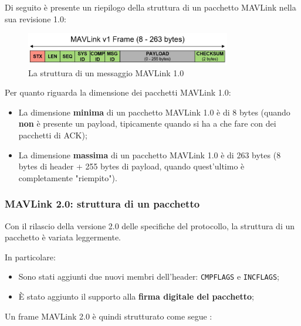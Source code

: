 \documentclass[a4paper, 12pt, oneside]{article}
\begin{document}
Di seguito è presente un riepilogo della struttura di un pacchetto MAVLink nella sua revisione 1.0:

\begin{figure}[H]
    \centering
    \includegraphics[width=0.8\textwidth]{images/packet_mavlink_v1.jpg}
    \caption{La struttura di un messaggio MAVLink 1.0}
\end{figure}

Per quanto riguarda la dimensione dei pacchetti MAVLink 1.0:

\begin{itemize}
    \item La dimensione \textbf{minima} di un pacchetto MAVLink 1.0 è di 8 bytes (quando \textbf{non} è presente un payload, tipicamente quando si ha a che fare con dei pacchetti di ACK);
    \item La dimensione \textbf{massima} di un pacchetto MAVLink 1.0 è di 263 bytes (8 bytes di header + 255 bytes di payload, quando quest'ultimo è completamente "riempito").
\end{itemize}

\newpage

\subsubsection{MAVLink 2.0: struttura di un pacchetto}

Con il rilascio della versione 2.0 delle specifiche del protocollo, la struttura di un pacchetto è variata leggermente.

In particolare:

\begin{itemize}
    \item Sono stati aggiunti due nuovi membri dell'header: \texttt{CMPFLAGS} e \texttt{INCFLAGS};
    \item È stato aggiunto il supporto alla \textbf{firma digitale del pacchetto};\\
\end{itemize}
Un frame MAVLink 2.0 è quindi strutturato come segue \cite{mavlink-2-packet}:
\end{document}
